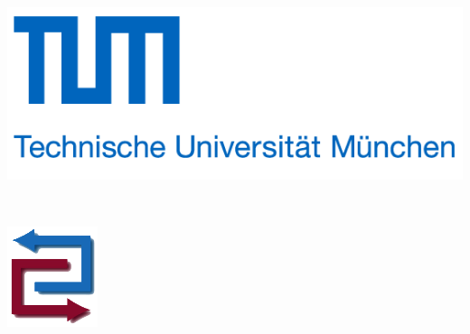 %
%
\begin{titlepage}
\begin{center}
  \begin{minipage}[t]{0.43\textwidth}
		\vspace*{0pt}
    \includegraphics[width=\textwidth]{pics/tum_logo}
  \end{minipage}
  \begin{minipage}[t]{0.45\textwidth}
    \vspace*{0pt}
		\centering {} \\
  \vspace{0.4cm}
  \centering {}
  \end{minipage}
  \begin{minipage}[t]{0.085\textwidth}
    \vspace*{0pt}
    \flushright \includegraphics[width=\textwidth]{pics/lsr_logo}
  \end{minipage}
  

\end{center}
\end{titlepage}
